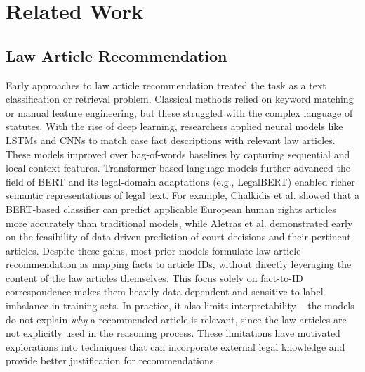 \documentclass[review,times,nonatbib]{elsarticle} %
\begin{document}
\section{Related Work}
\label{sec:relatedwork}
\subsection{Law Article Recommendation} 
Early approaches to law article recommendation treated the task as a text classification or retrieval problem. Classical methods relied on keyword matching or manual feature engineering, but these struggled with the complex language of statutes. With the rise of deep learning, researchers applied neural models like LSTMs\cite{hochreiter1997long} and CNNs\cite{kim2014convolutional} to match case fact descriptions with relevant law articles. These models improved over bag-of-words baselines by capturing sequential and local context features. Transformer-based language models further advanced the field of BERT\cite{devlin2019bert} and its legal-domain adaptations (e.g., LegalBERT\cite{chalkidis2020legal}) enabled richer semantic representations of legal text. For example, Chalkidis et al.\cite{chalkidis2019neural} showed that a BERT-based classifier can predict applicable European human rights articles more accurately than traditional models, while Aletras et al.\cite{aletras2016predicting} demonstrated early on the feasibility of data-driven prediction of court decisions and their pertinent articles. Despite these gains, most prior models formulate law article recommendation as mapping facts to article IDs, without directly leveraging the content of the law articles themselves. This focus solely on fact-to-ID correspondence makes them heavily data-dependent and sensitive to label imbalance in training sets. In practice, it also limits interpretability – the models do not explain \emph{why} a recommended article is relevant, since the law articles are not explicitly used in the reasoning process. These limitations have motivated explorations into techniques that can incorporate external legal knowledge and provide better justification for recommendations.
\end{document}
